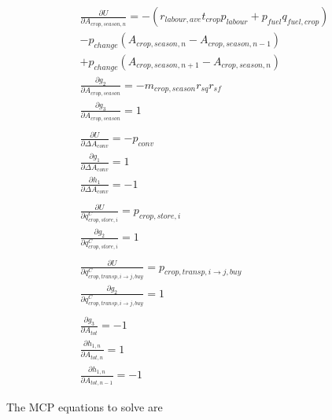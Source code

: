 \documentclass[letter,12pt]{article}
\begin{document}
\begin{gather}
\frac{\partial U}{\partial A_{crop,season,n}} = - \left(r_{labour,ave} t_{crop} p_{labour} + p_{fuel} q_{fuel,crop}\right) \nonumber \\
- p_{change} \left(A_{crop,season,n} - A_{crop,season,n-1}\right) \nonumber \\
+ p_{change} \left(A_{crop,season,n+1} - A_{crop,season,n}\right) \\
\frac{\partial g_2}{\partial A_{crop,season}} = - m_{crop,season} r_{sq} r_{sf} \\
\frac{\partial g_3}{\partial A_{crop,season}} = 1\\ 
\nonumber \\
\frac{\partial U}{\partial \Delta A_{conv}} = -p_{conv} \\
\frac{\partial g_1}{\partial \Delta A_{conv}} = 1 \\
\frac{\partial h_1}{\partial \Delta A_{conv}} = -1 \\
\nonumber \\
\frac{\partial U}{\partial q_{crop,store,i}^C} = p_{crop,store,i} \\
\frac{\partial g_2}{\partial q_{crop,store,i}^C} = 1 \\
\nonumber \\
\frac{\partial U}{\partial q_{crop,transp,i\rightarrow j,buy}^C} = p_{crop,transp,i \rightarrow j,buy} \\
\frac{\partial g_2}{\partial q_{crop,transp,i\rightarrow j,buy}^C} = 1 \\
\nonumber \\
\frac{\partial g_3}{\partial A_{tot}} = -1 \\
\frac{\partial h_{1,n}}{\partial A_{tot,n}} = 1 \\
\frac{\partial h_{1,n}}{\partial A_{tot,n-1}} = -1
\end{gather}

The MCP equations to solve are
\end{document}
